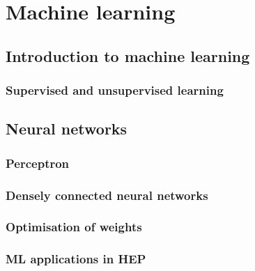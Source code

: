 \documentclass[main.tex]{subfiles}
\begin{document}
\chapter{Machine learning}
\label{chapter:ml}
\section{Introduction to machine learning}
\subsection{Supervised and unsupervised learning}
\section{Neural networks}
\subsection{Perceptron}
\subsection{Densely connected neural networks}
\subsection{Optimisation of weights}
\subsection{ML applications in HEP}
\end{document}
